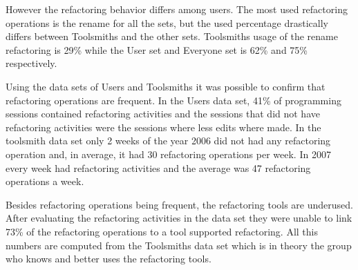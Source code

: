 However the refactoring behavior differs among users. The most used refactoring operations is the rename for all the sets, but the used percentage drastically differs between Toolsmiths and the other sets. Toolsmiths usage of the rename refactoring is 29\% while the User set and Everyone set is 62\% and 75\% respectively.

Using the data sets of Users and Toolsmiths it was possible to confirm that refactoring operations are frequent. 
In the Users data set, 41\% of programming sessions contained refactoring activities and the sessions that did not have refactoring activities were the sessions where less edits where made.
In the toolsmith data set only 2 weeks of the year 2006 did not had any refactoring operation and, in average, it had 30 refactoring operations per week. 
In 2007 every week had refactoring activities and the average was 47 refactoring operations a week.

Besides refactoring operations being frequent, the refactoring tools are underused. 
After evaluating the refactoring activities in the data set they were unable to link 73\% of the refactoring operations to a tool supported refactoring. 
All this numbers are computed from the Toolsmiths data set which is in theory the group who knows and better uses the refactoring tools.


